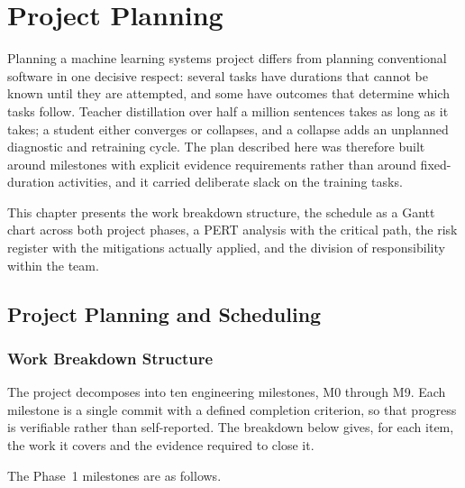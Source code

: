 \chapter{Project Planning}
\label{ch:planning}

Planning a machine learning systems project differs from planning conventional
software in one decisive respect: several tasks have durations that cannot be
known until they are attempted, and some have outcomes that determine which
tasks follow. Teacher distillation over half a million sentences takes as long
as it takes; a student either converges or collapses, and a collapse adds an
unplanned diagnostic and retraining cycle. The plan described here was therefore
built around milestones with explicit evidence requirements rather than around
fixed-duration activities, and it carried deliberate slack on the training
tasks.

This chapter presents the work breakdown structure, the schedule as a Gantt
chart across both project phases, a PERT analysis with the critical path, the
risk register with the mitigations actually applied, and the division of
responsibility within the team.

\section{Project Planning and Scheduling}
\label{sec:planning}

\subsection{Work Breakdown Structure}
\label{subsec:wbs}

The project decomposes into ten engineering milestones, M0 through M9. Each milestone is a single commit with a
defined completion criterion, so that progress is verifiable rather than
self-reported. The breakdown below gives, for each item, the work it covers and the
evidence required to close it.

The Phase~1 milestones are as follows.

